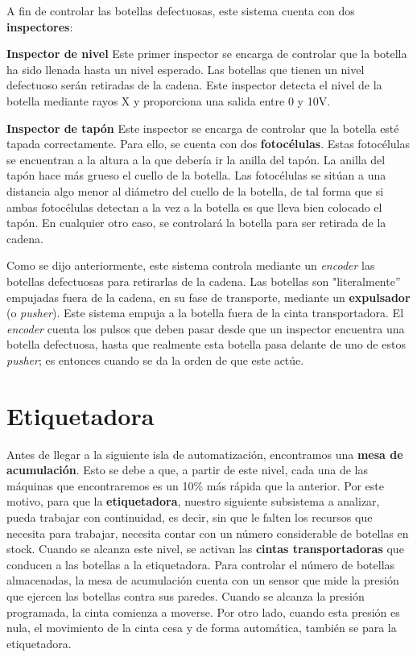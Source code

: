 \documentclass[11pt,a4paper,spanish,twoside]{report}
\begin{document}
A fin de controlar las botellas defectuosas, este sistema cuenta con dos 
\textbf{inspectores}:
\begin{description}
\item \textbf{Inspector de nivel}
Este primer inspector se encarga de controlar que la botella ha sido llenada 
hasta un nivel esperado. Las botellas que tienen un nivel defectuoso serán 
retiradas de la cadena. Este inspector detecta el nivel de la botella mediante 
rayos X y proporciona una salida entre 0 y 10V.

\item \textbf{Inspector de tapón}
Este inspector se encarga de controlar que la botella esté tapada 
correctamente. Para ello, se cuenta con dos \textbf{fotocélulas}. Estas 
fotocélulas se encuentran a la altura a la que debería ir la anilla del tapón.
La anilla del tapón hace más grueso el cuello de la botella. Las fotocélulas 
se sitúan a una distancia algo menor al diámetro del cuello de la botella, de
tal forma que si ambas fotocélulas detectan a la vez a la botella es que lleva
bien colocado el tapón. En cualquier otro caso, se controlará la botella para
ser retirada de la cadena.
\end{description}

Como se dijo anteriormente, este sistema controla mediante un \emph{encoder} 
las botellas defectuosas para retirarlas de la cadena. Las botellas son 
"literalmente'' empujadas fuera de la cadena, en su fase de transporte, 
mediante un \textbf{expulsador} (o \emph{pusher}). Este sistema empuja a la
botella fuera de la cinta transportadora. El \emph{encoder} cuenta los pulsos
que deben pasar desde que un inspector encuentra una botella defectuosa, hasta
que realmente esta botella pasa delante de uno de estos \emph{pusher}; es 
entonces cuando se da la orden de que este actúe.

\section{Etiquetadora}
Antes de llegar a la siguiente isla de automatización, encontramos una 
\textbf{mesa de acumulación}. Esto se debe a que, a partir de este nivel, cada
una de las máquinas que encontraremos es un 10\% más rápida que la anterior.
Por este motivo, para que la \textbf{etiquetadora}, nuestro siguiente 
subsistema a analizar, pueda trabajar con continuidad, es decir, sin que le 
falten los recursos que necesita para trabajar, necesita contar con un número 
considerable de botellas en stock. Cuando se alcanza este nivel, se activan 
las \textbf{cintas transportadoras} que conducen a las botellas a la 
etiquetadora. Para controlar el número de botellas almacenadas, la mesa de 
acumulación cuenta con un sensor que mide la presión que ejercen las botellas 
contra sus paredes. Cuando se alcanza la presión programada, la cinta comienza 
a moverse. Por otro lado, cuando esta presión es nula, el movimiento de la 
cinta cesa y de forma automática, también se para la etiquetadora.
\end{document}

